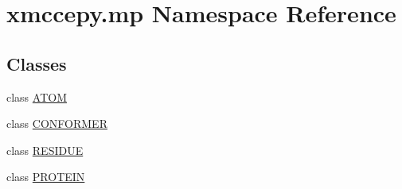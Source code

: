 \hypertarget{namespacexmccepy_1_1mp}{\section{xmccepy.\-mp Namespace Reference}
\label{namespacexmccepy_1_1mp}
}
\subsection*{Classes}
\begin{DoxyCompactItemize}
\item 
class \hyperlink{classxmccepy_1_1mp_1_1_a_t_o_m}{A\-T\-O\-M}
\item 
class \hyperlink{classxmccepy_1_1mp_1_1_c_o_n_f_o_r_m_e_r}{C\-O\-N\-F\-O\-R\-M\-E\-R}
\item 
class \hyperlink{classxmccepy_1_1mp_1_1_r_e_s_i_d_u_e}{R\-E\-S\-I\-D\-U\-E}
\item 
class \hyperlink{classxmccepy_1_1mp_1_1_p_r_o_t_e_i_n}{P\-R\-O\-T\-E\-I\-N}
\end{DoxyCompactItemize}
